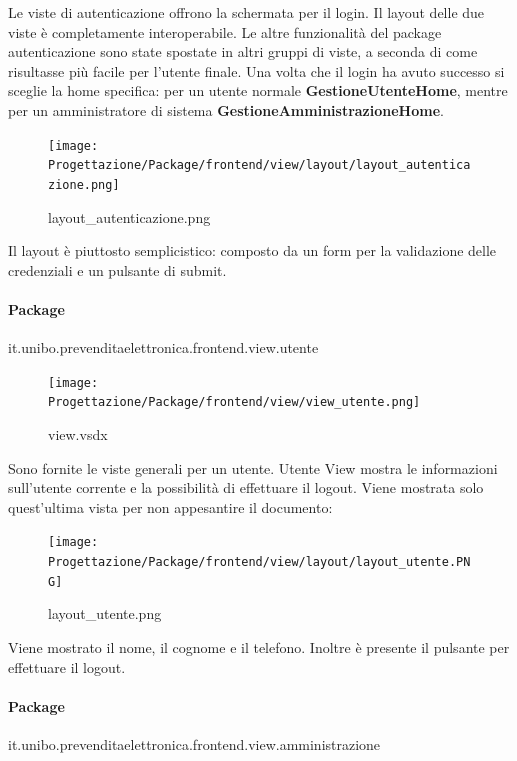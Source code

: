 \documentclass[a4paper]{article}
\begin{document}
Le viste di autenticazione offrono la schermata per il login. Il layout delle due viste è completamente interoperabile. Le altre funzionalità del package autenticazione sono state spostate in altri gruppi di viste, a seconda di come risultasse più facile per l'utente finale. Una volta che il login ha avuto successo si sceglie la home specifica: per un utente normale \textbf{GestioneUtenteHome}, mentre per un amministratore di sistema \textbf{GestioneAmministrazioneHome}.

\begin{figure}[H]
    \texttt{[image: Progettazione/Package/frontend/view/layout/layout\_autenticazione.png]}
    \centering
    \caption{layout\_autenticazione.png}
\end{figure}

Il layout è piuttosto semplicistico: composto da un form per la validazione delle credenziali e un pulsante di submit.

\newpage

\paragraph{Package} it.unibo.prevenditaelettronica.frontend.view.utente


\begin{figure}[H]
    \texttt{[image: Progettazione/Package/frontend/view/view\_utente.png]}
    \centering
    \caption{view.vsdx}
\end{figure}

Sono fornite le viste generali per un utente. Utente View mostra le informazioni sull'utente corrente e la possibilità di effettuare il logout. Viene mostrata solo quest'ultima vista per non appesantire il documento:

\begin{figure}[H]
    \texttt{[image: Progettazione/Package/frontend/view/layout/layout\_utente.PNG]}
    \centering
    \caption{layout\_utente.png}
\end{figure}

Viene mostrato il nome, il cognome e il telefono. Inoltre è presente il pulsante per effettuare il logout.

\newpage

\paragraph{Package} it.unibo.prevenditaelettronica.frontend.view.amministrazione
\end{document}
